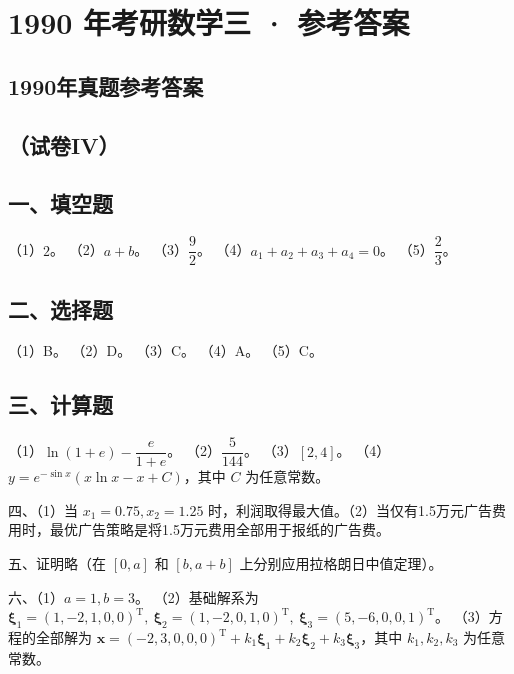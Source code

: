 \documentclass[UTF8,12pt]{ctexart}
\begin{document}
\section*{1990 年考研数学三 · 参考答案}
\subsection*{1990年真题参考答案}

\subsection*{（试卷IV）}

\subsection*{一、填空题}

（1）\(\displaystyle 2\)。 （2）\(\displaystyle a+b\)。 （3）\(\displaystyle \dfrac{\displaystyle 9}{\displaystyle 2}\)。 （4）\(\displaystyle a_1+a_2+a_3+a_4=0\)。 （5）\(\displaystyle \dfrac{\displaystyle 2}{\displaystyle 3}\)。


\subsection*{二、选择题}

（1）B。 （2）D。 （3）C。 （4）A。 （5）C。


\subsection*{三、计算题}

（1）\(\displaystyle \ln(1+e)-\dfrac{\displaystyle e}{\displaystyle 1+e}\)。 （2）\(\displaystyle \dfrac{\displaystyle 5}{\displaystyle 144}\)。 （3）\(\displaystyle [2,\allowbreak 4]\)。 （4）\(\displaystyle y=e^{-\sin x}(x\ln x-x+C)\)，其中 \(\displaystyle C\) 为任意常数。


四、（1）当 \(\displaystyle x_1=0.75,\allowbreak x_2=1.25\) 时，利润取得最大值。（2）当仅有1.5万元广告费用时，最优广告策略是将1.5万元费用全部用于报纸的广告费。


五、证明略（在 \(\displaystyle [0,\allowbreak a]\) 和 \(\displaystyle [b,\allowbreak a+b]\) 上分别应用拉格朗日中值定理）。


六、（1）\(\displaystyle a=1,\allowbreak b=3\)。 （2）基础解系为 \(\displaystyle \boldsymbol\xi_1=(1,\allowbreak -2,\allowbreak 1,\allowbreak 0,\allowbreak 0)^{\mathrm T},\allowbreak \ \boldsymbol\xi_2=(1,\allowbreak -2,\allowbreak 0,\allowbreak 1,\allowbreak 0)^{\mathrm T},\allowbreak \ \boldsymbol\xi_3=(5,\allowbreak -6,\allowbreak 0,\allowbreak 0,\allowbreak 1)^{\mathrm T}\)。 （3）方程的全部解为 \(\displaystyle \boldsymbol x=(-2,\allowbreak 3,\allowbreak 0,\allowbreak 0,\allowbreak 0)^{\mathrm T}+k_1\boldsymbol\xi_1+k_2\boldsymbol\xi_2+k_3\boldsymbol\xi_3\)，其中 \(\displaystyle k_1,\allowbreak k_2,\allowbreak k_3\) 为任意常数。
\end{document}

